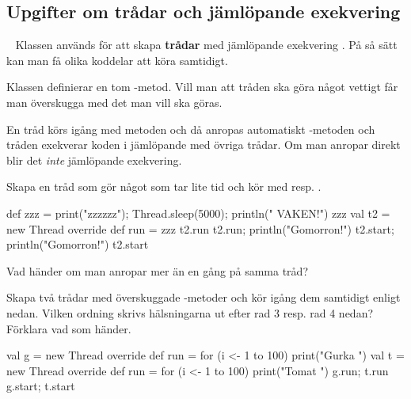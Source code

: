 \QUESTEND














%
%
%
%
%
%
%
%
%
%
%


\subsection{Upgifter om trådar och jämlöpande exekvering}


\QUESTBEGIN

\Task  \what~   Klassen  används för att skapa  \textbf{trådar} med jämlöpande exekvering . På så sätt kan man få olika koddelar att köra samtidigt.

Klassen  definierar en tom -metod. Vill man att tråden ska göra något vettigt får man överskugga  med det man vill ska göras.

En tråd körs igång med metoden  och då anropas automatiskt -metoden och tråden exekverar koden i  jämlöpande med övriga trådar. Om man anropar  direkt blir det \emph{inte} jämlöpande exekvering.

\Subtask Skapa en tråd som gör något som tar lite tid och kör med  resp. .
\begin{REPL}
def zzz = { print("zzzzzz"); Thread.sleep(5000); println(" VAKEN!")}
zzz
val t2 = new Thread{ override def run = zzz }
t2.run
t2.run; println("Gomorron!")
t2.start; println("Gomorron!")
t2.start
\end{REPL}

\Subtask Vad händer om man anropar  mer än en gång på samma tråd?

\Subtask Skapa två trådar med överskuggade -metoder och kör igång dem samtidigt enligt nedan. Vilken ordning skrivs hälsningarna ut efter rad 3 resp. rad 4 nedan? Förklara vad som händer.
\begin{REPL}
val g = new Thread{ override def run = for (i <- 1 to 100) print("Gurka ") }
val t = new Thread{ override def run = for (i <- 1 to 100) print("Tomat ") }
g.run; t.run
g.start; t.start
\end{REPL}


